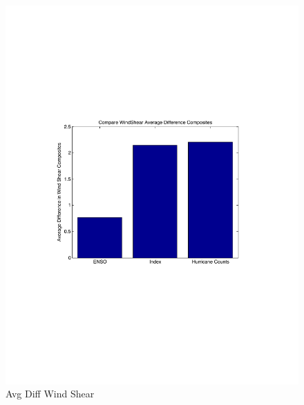 \documentclass[a4paper,10pt]{article}
\begin{document}
\begin{figure}[ht]
\begin{minipage}[b]{0.6\linewidth}
\includegraphics[width=\textwidth]{figs/sensitivityResults/compositeBarGraphs/avgDiffWindShearBarGraph.pdf}
\caption{Avg Diff Wind Shear}
\label{fig:figure2}
\end{minipage}
\end{figure}
\end{document}
